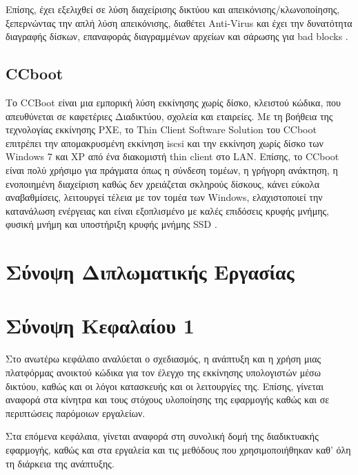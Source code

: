 Επίσης, έχει εξελιχθεί σε λύση διαχείρισης δικτύου και απεικόνισης/κλωνοποίησης, ξεπερνώντας την απλή λύση απεικόνισης, διαθέτει Anti-Virus και έχει την δυνατότητα διαγραφής δίσκων, επαναφοράς διαγραμμένων αρχείων και σάρωσης για bad blocks \cite{FOG_2020}.

\subsection{CCboot}
Το CCBoot είναι μια εμπορική λύση εκκίνησης χωρίς δίσκο, κλειστού κώδικα, που απευθύνεται σε καφετέριες Διαδικτύου, σχολεία και εταιρείες.
Με τη βοήθεια της τεχνολογίας εκκίνησης PXE, το Thin Client Software Solution του CCboot επιτρέπει την απομακρυσμένη εκκίνηση iscsi και την εκκίνηση χωρίς δίσκο των Windows 7 και XP από ένα διακομιστή thin client στο LAN.
Επίσης, το CCboot είναι πολύ χρήσιμο για πράγματα όπως η σύνδεση τομέων, η γρήγορη ανάκτηση, η ενοποιημένη διαχείριση καθώς δεν χρειάζεται σκληρούς δίσκους, κάνει εύκολα αναβαθμίσεις, λειτουργεί τέλεια με τον τομέα των Windows, ελαχιστοποιεί την κατανάλωση ενέργειας και είναι εξοπλισμένο με καλές επιδόσεις κρυφής μνήμης, φυσική μνήμη και υποστήριξη κρυφής μνήμης SSD \cite{CCboot_2022}.

\section{Σύνοψη Διπλωματικής Εργασίας}

\section{Σύνοψη Κεφαλαίου 1}
Στο ανωτέρω κεφάλαιο αναλύεται ο σχεδιασμός, η ανάπτυξη και η χρήση μιας πλατφόρμας ανοικτού κώδικα για τον έλεγχο της εκκίνησης υπολογιστών μέσω δικτύου, καθώς και οι λόγοι κατασκευής και οι λειτουργίες της. Επίσης, γίνεται αναφορά στα κίνητρα και τους στόχους υλοποίησης της εφαρμογής καθώς και σε περιπτώσεις παρόμοιων εργαλείων.

Στα επόμενα κεφάλαια, γίνεται αναφορά στη συνολική δομή της διαδικτυακής εφαρμογής, καθώς και στα εργαλεία και τις μεθόδους που χρησιμοποιήθηκαν καθ' όλη τη διάρκεια της ανάπτυξης.

